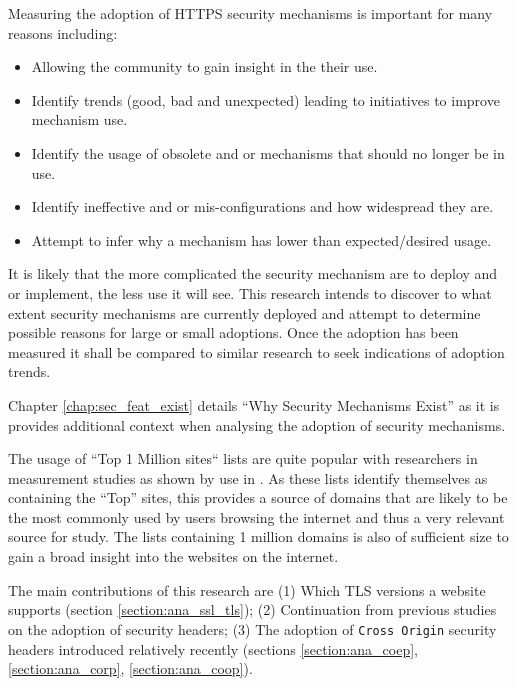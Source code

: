 \documentclass{mscreport}
\begin{document}
\vspace{0.6cm} \noindent
Measuring the adoption of HTTPS security mechanisms is important for many reasons including:
\begin{itemize}
	\setlength\itemsep{0.1em}
	\item Allowing the community to gain insight in the their use.
	\item Identify trends (good, bad and unexpected) leading to initiatives to improve mechanism use.
	\item Identify the usage of obsolete and or mechanisms that should no longer be in use.
	\item Identify ineffective and or mis-configurations and how widespread they are.
	\item Attempt to infer why a mechanism has lower than expected/desired usage.
\end{itemize}

\noindent
It is likely that the more complicated the security mechanism are to deploy and or implement, the less use it will see. This research intends to discover to what extent security mechanisms are currently deployed and attempt to determine possible reasons for large or small adoptions. Once the adoption has been measured it shall be compared to similar research to seek indications of adoption trends.

\vspace{0.3cm} \noindent
Chapter \ref{chap:sec_feat_exist} details ``Why Security Mechanisms Exist'' as it is provides additional context when analysing the adoption of security mechanisms.

\vspace{0.3cm} \noindent
The usage of ``Top 1 Million sites`` lists are quite popular with researchers in measurement studies as shown by use in \cite{Buchanan2018-xz,Chen2016-dl,Kumar2017-qw,Patil2017-bg,Ying2016-ag,Michael2015-hn,Van_Goethem2014-ao,Holz2020-ha,Poteat2021-zr}. As these lists identify themselves as containing the ``Top'' sites, this provides a source of domains that are likely to be the most commonly used by users browsing the internet and thus a very relevant source for study. The lists containing 1 million domains is also of sufficient size to gain a broad insight into the websites on the internet.

\vspace{0.3cm} \noindent
The main contributions of this research are (1) Which TLS versions a website supports (section \ref{section:ana_ssl_tls}); (2) Continuation from previous studies on the adoption of security headers; (3) The adoption of \texttt{Cross Origin} security headers introduced relatively recently (sections \ref{section:ana_coep}, \ref{section:ana_corp}, \ref{section:ana_coop}).
\end{document}
